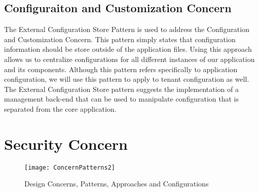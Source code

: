 \subsection{Configuraiton and Customization Concern}
The External Configuration Store Pattern is used to address the Configuration and Customization Concern. This pattern simply states that configuration information should be store outside of the application files. Using this approach allows us to centralize configurations for all different instances of our application and its components. Although this pattern refers specifically to application configuration, we will use this pattern to apply to tenant configuration as well. The External Configuration Store pattern suggests the implementation of a management back-end that can be used to manipulate configuration that is separated from the core application.

\section{Security Concern}


\begin{figure}
\centering
\texttt{[image: ConcernPatterns2]}
\caption{Design Concerns, Patterns, Approaches and Configurations}
\label{fig:concernpatterns}
\end{figure}
